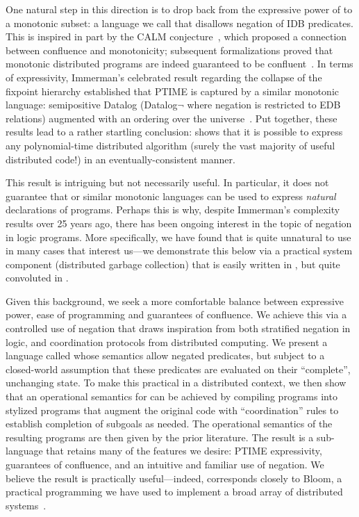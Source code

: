 One natural step in this direction is to drop back from the expressive power of \lang to a monotonic subset: a language we call \slang that disallows negation of IDB predicates.  This is inspired in part by the CALM conjecture~\cite{cidr11, declarative-imperative}, which proposed a connection between confluence
and monotonicity; subsequent formalizations proved that monotonic distributed programs are indeed guaranteed to be confluent~\cite{Abiteboul2011,relational-transducers}.  
In terms of expressivity, Immerman's celebrated result regarding the collapse of the fixpoint hierarchy established that PTIME is captured by a similar monotonic language: semipositive Datalog (Datalog$\lnot$ where negation is restricted to EDB relations) augmented with an ordering over the universe~\cite{immerman-ptime}.  Put together, these results lead to a rather startling conclusion: \slang shows that it is possible to express any polynomial-time distributed algorithm (surely the vast majority of useful distributed code!) in an eventually-consistent manner.

This result is intriguing but not necessarily useful.  In particular, it does not guarantee that \slang or similar monotonic languages can be used to express {\em natural} declarations of programs. Perhaps this is why, despite Immerman's complexity results over 25 years ago, there has been ongoing interest in the topic of negation in logic programs.  More specifically, we have found that \slang is quite unnatural to use in many cases that interest us---we demonstrate this below via a practical system component (distributed garbage collection) that is easily written in \lang, but quite convoluted in \slang.

Given this background, we seek a more comfortable balance between expressive power, ease of programming and guarantees of confluence.  We achieve this via a controlled use of negation that draws inspiration from both stratified negation in logic, and coordination protocols from distributed computing.  We present a language called \plang whose semantics allow negated predicates, but subject to a closed-world assumption that these predicates are evaluated on their ``complete'', unchanging state.  To make this practical in a distributed context, we then show that an operational semantics for \plang can be achieved by compiling \plang programs into stylized \lang programs that augment the original code with ``coordination'' rules to establish completion of subgoals as needed. The operational semantics of the resulting \lang programs are then given by the prior literature.  The result is a sub-language that retains many of the features we desire: PTIME expressivity, guarantees of confluence, and an intuitive and familiar use of negation.  We believe the result is practically useful---indeed, \plang corresponds closely to Bloom, a practical programming we have used to implement a broad array of distributed systems~\cite{bloom}.

